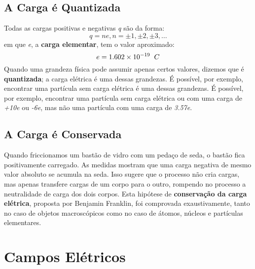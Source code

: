 \documentclass{article}
\begin{document}
\subsection{A Carga é Quantizada}
Todas as cargas positivas e negativas \textit{q} são da forma:
\newline
\[q = ne,   n = \pm 1, \pm 2, \pm 3, \dots \]
\newline
em que \textit{e}, a \textbf{carga elementar}, tem o valor aproximado:
\newline
\[e = 1.602 \times 10^{-19} \hspace{0.2cm}C \]
\newline
Quando uma grandeza física pode assumir apenas certos valores, dizemos que é \textbf{quantizada}; a carga elétrica é uma dessas grandezas. É possível, por exemplo, encontrar uma partícula sem carga elétrica é uma dessas grandezas. É possível, por exemplo, encontrar uma partícula sem carga elétrica ou com uma carga de \textit{+10e} ou \textit{-6e}, mas não uma partícula com uma carga  de \textit{3.57e}.
\newpage
\subsection{A Carga é Conservada}
Quando friccionamos um bastão de vidro com um pedaço de seda, o bastão fica positivamente carregado. As medidas mostram que uma carga negativa de mesmo valor absoluto se acumula na seda. Isso sugere que o processo não cria cargas, mas apenas transfere cargas de um corpo para o outro, rompendo no processo a neutralidade de carga dos dois corpos. Esta hipótese de \textbf{conservação da carga elétrica}, proposta por Benjamin Franklin, foi comprovada exaustivamente, tanto no caso de objetos macroscópicos como no caso de átomos, núcleos e partículas elementares.
\section{Campos Elétricos}
\end{document}
